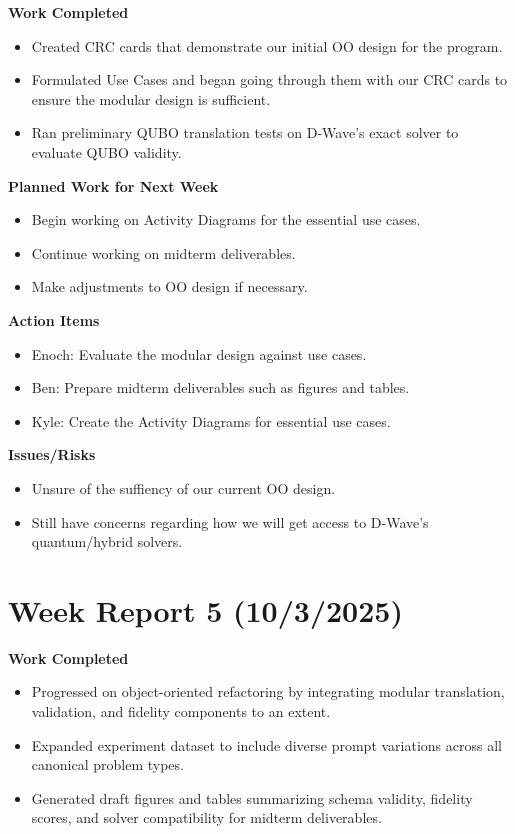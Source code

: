 \textbf{Work Completed}
\begin{itemize}
    \item Created CRC cards that demonstrate our initial OO design for the program.
    \item Formulated Use Cases and began going through them with our CRC cards to ensure the modular design is sufficient.
    \item Ran preliminary QUBO translation tests on D-Wave's exact solver to evaluate QUBO validity.
\end{itemize}

\textbf{Planned Work for Next Week}
\begin{itemize}
    \item Begin working on Activity Diagrams for the essential use cases.
    \item Continue working on midterm deliverables.
    \item Make adjustments to OO design if necessary.
\end{itemize}

\textbf{Action Items}
\begin{itemize}
    \item Enoch: Evaluate the modular design against use cases.
    \item Ben: Prepare midterm deliverables such as figures and tables.
    \item Kyle: Create the Activity Diagrams for essential use cases.
\end{itemize}

\textbf{Issues/Risks}
\begin{itemize}
    \item Unsure of the suffiency of our current OO design.
    \item Still have concerns regarding how we will get access to D-Wave's quantum/hybrid solvers.
\end{itemize}

\section{Week Report 5 (10/3/2025)}

\textbf{Work Completed}
\begin{itemize}
    \item Progressed on object-oriented refactoring by integrating modular translation, validation, and fidelity components to an extent.
    \item Expanded experiment dataset to include diverse prompt variations across all canonical problem types.
    \item Generated draft figures and tables summarizing schema validity, fidelity scores, and solver compatibility for midterm deliverables.
\end{itemize}

